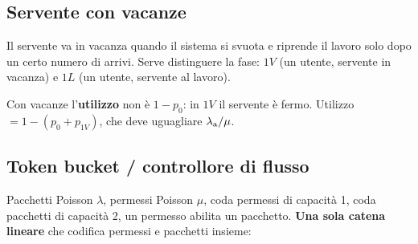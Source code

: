 \subsection{Servente con vacanze}
Il servente va in vacanza quando il sistema si svuota e riprende il lavoro solo dopo un certo numero di arrivi. Serve distinguere la fase: $1V$ (un utente, servente in vacanza) e $1L$ (un utente, servente al lavoro).
\begin{center}
\end{center}
\begin{attenzione}
Con vacanze l'\textbf{utilizzo} non è $1-p_0$: in $1V$ il servente è fermo. Utilizzo $=1-(p_0+p_{1V})$, che deve uguagliare $\lambda_{\mathrm{a}}/\mu$.
\end{attenzione}

\subsection{Token bucket / controllore di flusso}
Pacchetti Poisson $\lambda$, permessi Poisson $\mu$, coda permessi di capacità 1, coda pacchetti di capacità 2, un permesso abilita un pacchetto. \textbf{Una sola catena lineare} che codifica permessi e pacchetti insieme:


